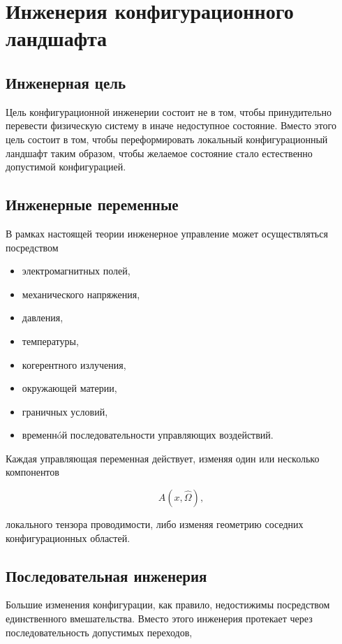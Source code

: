 \chapter{Инженерия конфигурационного ландшафта}

\section{Инженерная цель}

Цель конфигурационной инженерии состоит не в том, чтобы принудительно перевести физическую систему в иначе недоступное состояние. Вместо этого цель состоит в том, чтобы переформировать локальный конфигурационный ландшафт таким образом, чтобы желаемое состояние стало естественно допустимой конфигурацией.

\section{Инженерные переменные}

В рамках настоящей теории инженерное управление может осуществляться посредством

\begin{itemize}
\item электромагнитных полей,
\item механического напряжения,
\item давления,
\item температуры,
\item когерентного излучения,
\item окружающей материи,
\item граничных условий,
\item временнóй последовательности
управляющих воздействий.
\end{itemize}

Каждая управляющая переменная действует, изменяя один или несколько компонентов

\[ A(x,\hat{\Omega}), \]

локального тензора проводимости, либо изменяя геометрию соседних конфигурационных областей.

\section{Последовательная инженерия}

Большие изменения конфигурации, как правило, недостижимы посредством единственного вмешательства. Вместо этого инженерия протекает через последовательность допустимых переходов,

